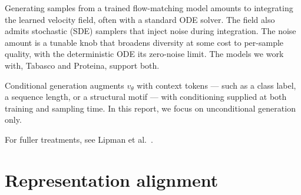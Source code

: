 \documentclass[12pt,a4paper,twoside]{report}
\begin{document}
Generating samples from a trained flow-matching model amounts to integrating the learned velocity field, often with a standard ODE solver. The field also admits stochastic (SDE) samplers that inject noise during integration. The noise amount is a tunable knob that broadens diversity at some cost to per-sample quality, with the deterministic ODE its zero-noise limit. The models we work with, Tabasco and Proteina, support both.

Conditional generation augments $v_\theta$ with context tokens --- such as a class label, a sequence length, or a structural motif --- with conditioning supplied at both training and sampling time. In this report, we focus on unconditional generation only.

For fuller treatments, see Lipman et al.~\cite{FlowMatching,FMGuide}.


\section{Representation alignment}
\label{sec:repa}
\end{document}
